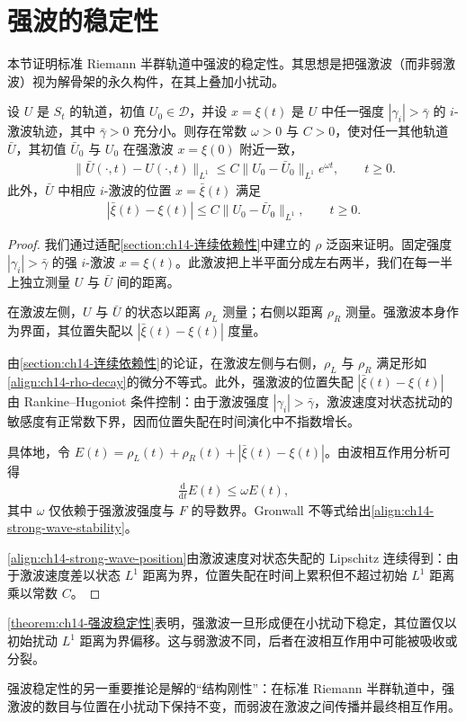 \documentclass[../../main.tex]{subfiles}
\begin{document}
\section{强波的稳定性}\label{section:ch14-强波的稳定性}

本节证明标准 Riemann 半群轨道中强波的稳定性。其思想是把强激波（而非弱激波）视为解骨架的永久构件，在其上叠加小扰动。

\begin{theorem}\label{theorem:ch14-强波稳定性}
设 $U$ 是 $S_t$ 的轨道，初值 $U_0\in\mathscr{D}$，并设 $x=\xi(t)$ 是 $U$ 中任一强度 $|\gamma_i|>\bar\gamma$ 的 $i$-激波轨迹，其中 $\bar\gamma>0$ 充分小。则存在常数 $\omega>0$ 与 $C>0$，使对任一其他轨道 $\bar U$，其初值 $\bar U_0$ 与 $U_0$ 在强激波 $x=\xi(0)$ 附近一致，
\begin{align}
\|\bar U(\cdot,t)-U(\cdot,t)\|_{L^1}\leqslant C\|U_0-\bar U_0\|_{L^1}e^{\omega t},\qquad t\geqslant0.
\label{align:ch14-strong-wave-stability}
\end{align}
此外，$\bar U$ 中相应 $i$-激波的位置 $x=\bar\xi(t)$ 满足
\begin{align}
|\bar\xi(t)-\xi(t)|\leqslant C\|U_0-\bar U_0\|_{L^1},\qquad t\geqslant0.
\label{align:ch14-strong-wave-position}
\end{align}
\end{theorem}

\begin{proof}
我们通过适配\cref{section:ch14-连续依赖性}中建立的 $\rho$ 泛函来证明。固定强度 $|\gamma_i|>\bar\gamma$ 的强 $i$-激波 $x=\xi(t)$。此激波把上半平面分成左右两半，我们在每一半上独立测量 $U$ 与 $\bar U$ 间的距离。

在激波左侧，$U$ 与 $\bar U$ 的状态以距离 $\rho_L$ 测量；右侧以距离 $\rho_R$ 测量。强激波本身作为界面，其位置失配以 $|\bar\xi(t)-\xi(t)|$ 度量。

由\cref{section:ch14-连续依赖性}的论证，在激波左侧与右侧，$\rho_L$ 与 $\rho_R$ 满足形如\eqref{align:ch14-rho-decay}的微分不等式。此外，强激波的位置失配 $|\bar\xi(t)-\xi(t)|$ 由 Rankine--Hugoniot 条件控制：由于激波强度 $|\gamma_i|>\bar\gamma$，激波速度对状态扰动的敏感度有正常数下界，因而位置失配在时间演化中不指数增长。

具体地，令 $E(t)=\rho_L(t)+\rho_R(t)+|\bar\xi(t)-\xi(t)|$。由波相互作用分析可得
\begin{align}
\frac{\mathrm{d}}{\mathrm{d}t}E(t)\leqslant\omega E(t),
\label{align:ch14-E-diff}
\end{align}
其中 $\omega$ 仅依赖于强激波强度与 $F$ 的导数界。Gronwall 不等式给出\eqref{align:ch14-strong-wave-stability}。

\eqref{align:ch14-strong-wave-position}由激波速度对状态失配的 Lipschitz 连续得到：由于激波速度差以状态 $L^1$ 距离为界，位置失配在时间上累积但不超过初始 $L^1$ 距离乘以常数 $C$。
\end{proof}

\cref{theorem:ch14-强波稳定性}表明，强激波一旦形成便在小扰动下稳定，其位置仅以初始扰动 $L^1$ 距离为界偏移。这与弱激波不同，后者在波相互作用中可能被吸收或分裂。

强波稳定性的另一重要推论是解的``结构刚性''：在标准 Riemann 半群轨道中，强激波的数目与位置在小扰动下保持不变，而弱波在激波之间传播并最终相互作用。
\end{document}
